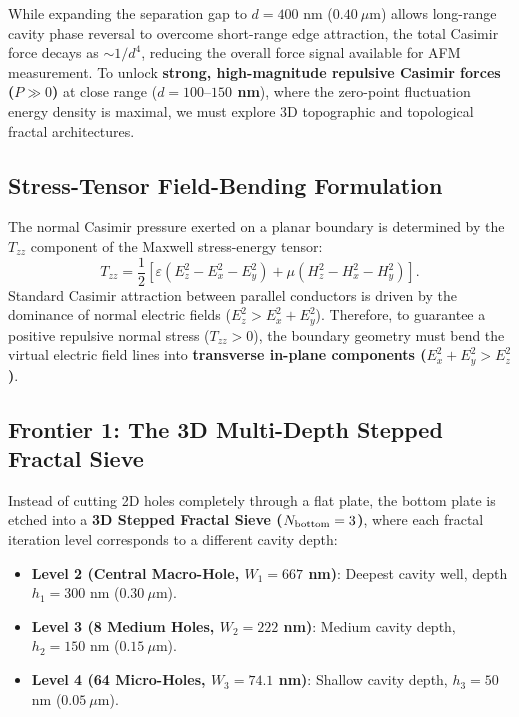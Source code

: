 \documentclass[12pt,letterpaper]{article}
\begin{document}
While expanding the separation gap to $d = 400$ nm ($0.40\ \mu\text{m}$) allows long-range cavity phase reversal to overcome short-range edge attraction, the total Casimir force decays as $\sim 1/d^4$, reducing the overall force signal available for AFM measurement. To unlock \textbf{strong, high-magnitude repulsive Casimir forces ($P \gg 0$)} at close range (\textbf{$d = 100\text{--}150$ nm}), where the zero-point fluctuation energy density is maximal, we must explore 3D topographic and topological fractal architectures.

\subsection{Stress-Tensor Field-Bending Formulation}
The normal Casimir pressure exerted on a planar boundary is determined by the $T_{zz}$ component of the Maxwell stress-energy tensor:
\begin{equation}
T_{zz} = \frac{1}{2} \left[ \varepsilon (E_z^2 - E_x^2 - E_y^2) + \mu (H_z^2 - H_x^2 - H_y^2) \right].
\label{eq:stress_tensor_tzz}
\end{equation}
Standard Casimir attraction between parallel conductors is driven by the dominance of normal electric fields ($E_z^2 > E_x^2 + E_y^2$). Therefore, to guarantee a positive repulsive normal stress ($T_{zz} > 0$), the boundary geometry must bend the virtual electric field lines into \textbf{transverse in-plane components ($E_x^2 + E_y^2 > E_z^2$)}.

\subsection{Frontier 1: The 3D Multi-Depth Stepped Fractal Sieve}
Instead of cutting 2D holes completely through a flat plate, the bottom plate is etched into a \textbf{3D Stepped Fractal Sieve ($N_{\rm bottom} = 3$)}, where each fractal iteration level corresponds to a different cavity depth:
\begin{itemize}
    \item \textbf{Level 2 (Central Macro-Hole, $W_1 = 667$ nm)}: Deepest cavity well, depth $h_1 = 300$ nm ($0.30\ \mu\text{m}$).
    \item \textbf{Level 3 (8 Medium Holes, $W_2 = 222$ nm)}: Medium cavity depth, $h_2 = 150$ nm ($0.15\ \mu\text{m}$).
    \item \textbf{Level 4 (64 Micro-Holes, $W_3 = 74.1$ nm)}: Shallow cavity depth, $h_3 = 50$ nm ($0.05\ \mu\text{m}$).
\end{itemize}
\end{document}
